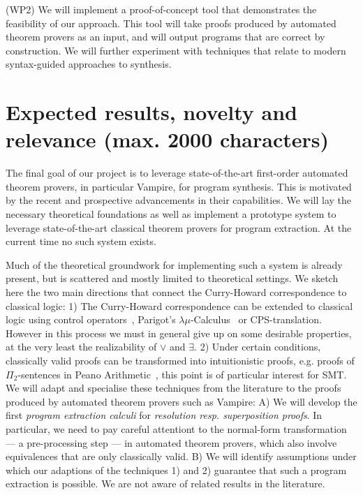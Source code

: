 \documentclass[a4paper,12pt]{article}
\begin{document}
(WP2) We will implement a proof-of-concept tool that demonstrates the feasibility of our approach.
This tool will take proofs produced by automated theorem provers as an input, and will output programs that are correct by construction.
We will further experiment with techniques that relate to modern syntax-guided approaches to synthesis.


\section{Expected results, novelty and relevance (max. 2000 characters)}

The final goal of our project is to leverage state-of-the-art first-order automated
theorem provers, in particular Vampire, for program synthesis.
This is motivated by the recent and prospective advancements in their capabilities.
We will lay the necessary theoretical foundations as well as implement a prototype system to leverage state-of-the-art classical theorem provers for program extraction.
At the current time no such system exists.

Much of the theoretical groundwork for implementing such a system is already present,
but is scattered and mostly limited to theoretical settings.
We sketch here the two main directions that connect the Curry-Howard correspondence to classical logic:
1) The Curry-Howard correspondence can be extended to classical logic using control operators~\cite{Control1}, Parigot's $\lambda\mu$-Calculus~\cite{Parigot1} or CPS-translation.
However in this process we must in general give up on some desirable properties, at the very least the realizability of $\vee$ and $\exists$.
2) Under certain conditions, classically valid proofs can be transformed into intuitionistic proofs, e.g. proofs of $\Pi_2$-sentences in Peano Arithmetic~\cite{HAPA}, {\color{blue}this point is of particular interest for SMT}.
We will adapt and specialise these techniques from the literature to the proofs produced by automated theorem provers such as Vampire:
A) We will develop the first\emph{ program extraction calculi} for \emph{resolution resp. superposition proofs}.
In particular, we need to pay careful attentiont to the normal-form transformation --- a pre-processing step --- in automated theorem provers, which also involve equivalences that are only classically valid.
B) We will identify assumptions under which our adaptions of the techniques 1) and 2) guarantee that such a program extraction is possible.
We are not aware of related results in the literature.
\end{document}

